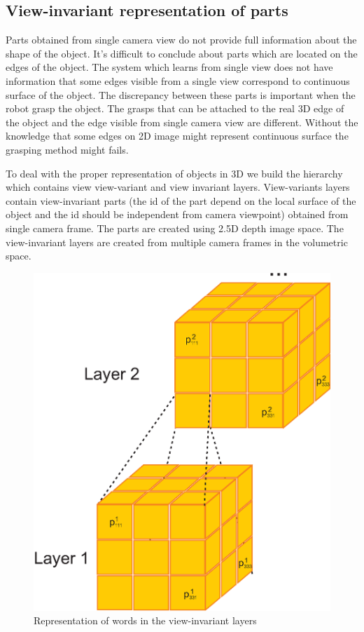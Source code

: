 \documentclass[letterpaper,10pt,conference]{ieeeconf}  %
\begin{document}
\subsection{View-invariant representation of parts}

Parts obtained from single camera view do not provide full information about the shape of the object. It's difficult to conclude about parts which are located on the edges of the object. The system which learns from single view does not have information that some edges visible from a single view correspond to continuous surface of the object. The discrepancy between these parts is important when the robot grasp the object. The grasps that can be attached to the real 3D edge of the object and the edge visible from single camera view are different. Without the knowledge that some edges on 2D image might represent continuous surface the grasping method might fails.

To deal with the proper representation of objects in 3D we build the hierarchy which contains view view-variant and view invariant layers. View-variants layers contain view-invariant parts (the id of the part depend on the local surface of the object and the id should be independent from camera viewpoint) obtained from single camera frame. The parts are created using 2.5D depth image space. The view-invariant layers are created from multiple camera frames in the volumetric space.

\begin{figure}[t]
 \centering
\includegraphics[width=0.75\columnwidth]{../images/wordInd.eps}
\caption{Representation of words in the view-invariant layers}
 \label{wordInv}
\end{figure}
\end{document}
